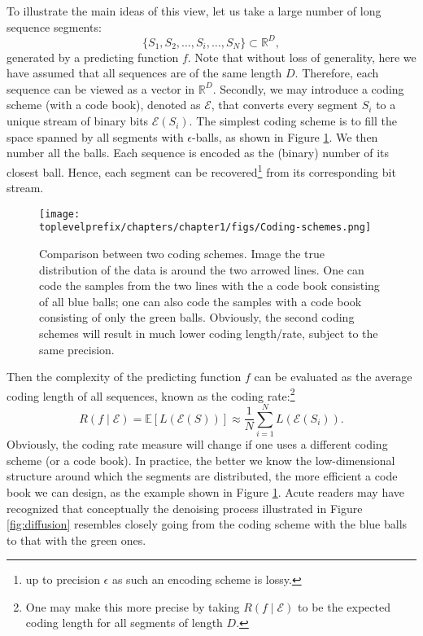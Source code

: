 \documentclass[\toplevelprefix/book-main.tex]{subfiles}
\begin{document}
To illustrate the main ideas of this view, let us take a large number of long sequence segments:
\begin{equation}
    \{S_1, S_2, \ldots, S_i, \ldots, S_N\} \subset \mathbb{R}^D,
\end{equation}
generated by a predicting function $f$. Note that without loss of generality, here we have assumed that all sequences are of the same length $D$. Therefore, each sequence can be viewed as a vector in $\mathbb{R}^D$. Secondly, we may introduce a coding scheme (with a code book), denoted as $\mathcal E$, that converts every segment $S_i$ to a unique stream of binary bits $\mathcal{E}(S_i)$. The simplest coding scheme is to fill the space spanned by all segments with $\epsilon$-balls, as shown in Figure \ref{fig:coding-schemes}. We then number all the balls. Each sequence is encoded as the (binary) number of its closest ball. Hence, each segment can be recovered\footnote{up to precision $\epsilon$ as such an encoding scheme is lossy.} from its corresponding bit stream. 
\begin{figure}
    \centering
    \texttt{[image: \\toplevelprefix/chapters/chapter1/figs/Coding-schemes.png]}
    \caption{Comparison between two coding schemes. Image the true distribution of the data is around the two arrowed lines. One can code the samples from the two lines with the a code book consisting of all blue balls; one can also code the samples with a code book consisting of only the green balls. Obviously, the second coding schemes will result in much lower coding length/rate, subject to the same precision.}
    \label{fig:coding-schemes}
\end{figure}


Then the complexity of the predicting function $f$ can be evaluated as the average coding length of all sequences, known as the coding rate:\footnote{One may make this more precise by taking $R(f\mid \mathcal{E})$ to be the expected coding length for all segments of length $D$. }
\begin{equation}
   R(f \mid \mathcal E) = \mathbb{E}[L(\mathcal{E}(S))] \approx \frac{1}{N}\sum_{i=1}^N L(\mathcal{E}(S_i)). 
   \label{eqn:coding-rate}
\end{equation}
Obviously, the coding rate measure will change if one uses a different coding  scheme (or a code book). In practice, the better we know the low-dimensional structure around which the segments are distributed, the more efficient a code book we can design, as the example shown in Figure \ref{fig:coding-schemes}. Acute readers may have recognized that conceptually the denoising process illustrated in Figure \ref{fig:diffusion} resembles closely going from the coding scheme with the blue balls to that with the green ones.
\end{document}
